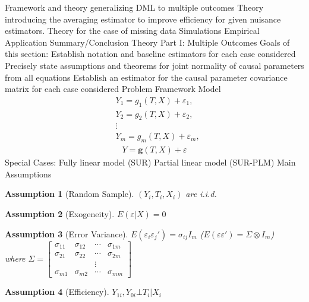 \documentclass[12pt]{article}
\newtheorem{assumption}{Assumption}
\begin{document}
\begin{outline}[enumerate]
			\3 Framework and theory generalizing DML to multiple outcomes
			\3 Theory introducing the averaging estimator to improve efficiency for given nuisance estimators.
			\3 Theory for the case of missing data
			\3 Simulations
			\3 Empirical Application
			\3 Summary/Conclusion
	\1 Theory Part I: Multiple Outcomes
		\2 Goals of this section:
			\3 Establish notation and baseline estimators for each case considered
			\3 Precisely state assumptions and theorems for joint normality of causal parameters from all equations
			\3 Establish an estimator for the causal parameter covariance matrix for each case considered
		\2 Problem Framework
			\3 Model
			\begin{align*}
				& Y_1 = g_1(T,X) +\varepsilon_1,\\
				& Y_2 =  g_2(T,X) +\varepsilon_2,\\
				&\vdots\\
				&Y_m =  g_m(T,X) +\varepsilon_m,
			\end{align*}
			\begin{align*}
				Y = \pmb{g}(T,X) + \varepsilon
			\end{align*}
			\3 Special Cases:
				\4 Fully linear model (SUR)
				\4 Partial linear model (SUR-PLM)
		\2 Main Assumptions
			\begin{assumption}[Random Sample]\label{as:random} $(Y_i,T_i,X_i)$ are i.i.d.\end{assumption}
			\begin{assumption}[Exogeneity]\label{as:exo} $E(\varepsilon|X) = 0$\end{assumption}
			\begin{assumption}[Error Variance]\label{as:var} 
				$E(\varepsilon_i\varepsilon_j') = \sigma_{ij} I_m$ ($E(\varepsilon\varepsilon') = \Sigma \otimes I_m$) \\
				 where $\Sigma =
				\begin{bmatrix}
					\sigma_{11} & \sigma_{12} & \cdots & \sigma_{1m}\\
					\sigma_{21} & \sigma_{22} & \cdots & \sigma_{2m}\\
								&			  &	\vdots & \\
					\sigma_{m1} & \sigma_{m2} & \cdots & \sigma_{mm}
				\end{bmatrix}$
			\end{assumption}
			\begin{assumption}[Efficiency]
				$Y_{1i},Y_{0i}\bot T_i|X_i$
			\end{assumption}
				

\end{outline}
\end{document}
